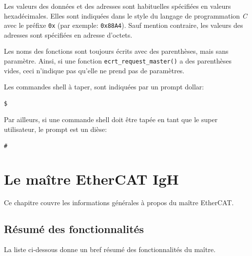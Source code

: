 \documentclass[a4paper,12pt,BCOR6mm,bibtotoc,idxtotoc]{scrbook}
\begin{document}
Les valeurs des donn\'ees et des adresses sont habituelles
sp\'ecifi\'ees en valeurs hexad\'ecimales. Elles sont indiqu\'ees dans
le style du langage de programmation \textit{C} avec le pr\'efixe
\lstinline+0x+ (par exemple: \lstinline+0x88A4+). Sauf mention
contraire, les valeurs des adresses sont sp\'ecifi\'ees en adresse
d'octets.


Les noms des fonctions sont toujours \'ecrits avec des parenth\`eses,
mais sans param\`etre.  Ainsi, si une fonction
\lstinline+ecrt_request_master()+ a des parenth\`eses vides, ceci
n'indique pas qu'elle ne prend pas de param\`etres.

Les commandes shell \`a taper, sont indiqu\'ees par un prompt dollar:

\begin{lstlisting}
$
\end{lstlisting}

Par ailleurs, si une commande shell doit \^etre tap\'ee en tant que le
super utilisateur, le prompt est un di\`ese:

\begin{lstlisting}
#
\end{lstlisting}


\chapter{Le ma\^itre EtherCAT IgH}
\label{chapter:master}

Ce chapitre couvre les informations g\'en\'erales \`a propos du
ma\^itre EtherCAT.


\section{R\'esum\'e des fonctionnalit\'es}
\label{sec:summary}

La liste ci-dessous donne un bref r\'esum\'e des fonctionnalit\'es du
ma\^itre.
\end{document}
